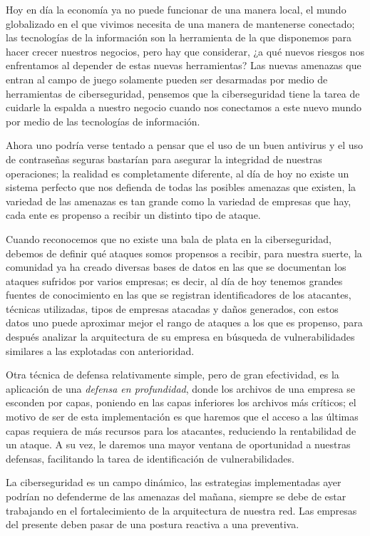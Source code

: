 \documentclass[12pt]{article}
\begin{document}
    Hoy en día la economía ya no puede funcionar de una manera local, el mundo globalizado en el que vivimos necesita de una manera de mantenerse conectado; las tecnologías de la información son la herramienta de la que disponemos para hacer crecer nuestros negocios, pero hay que considerar, ¿a qué nuevos riesgos nos enfrentamos al depender de estas nuevas herramientas? Las nuevas amenazas que entran al campo de juego solamente pueden ser desarmadas por medio de herramientas de ciberseguridad, pensemos que la ciberseguridad tiene la tarea de cuidarle la espalda a nuestro negocio cuando nos conectamos a este nuevo mundo por medio de las tecnologías de información.

    Ahora uno podría verse tentado a pensar que el uso de un buen antivirus y el uso de contraseñas seguras bastarían para asegurar la integridad de nuestras operaciones; la realidad es completamente diferente, al día de hoy no existe un sistema perfecto que nos defienda de todas las posibles amenazas que existen, la variedad de las amenazas es tan grande como la variedad de empresas que hay, cada ente es propenso a recibir un distinto tipo de ataque.

    Cuando reconocemos que no existe una bala de plata en la ciberseguridad, debemos de definir qué ataques somos propensos a recibir, para nuestra suerte, la comunidad ya ha creado diversas bases de datos en las que se documentan los ataques sufridos por varios empresas; es decir, al día de hoy tenemos grandes fuentes de conocimiento en las que se registran identificadores de los atacantes, técnicas utilizadas, tipos de empresas atacadas y daños generados, con estos datos uno puede aproximar mejor el rango de ataques a los que es propenso, para después analizar la arquitectura de su empresa en búsqueda de vulnerabilidades similares a las explotadas con anterioridad.

    Otra técnica de defensa relativamente simple, pero de gran efectividad, es la aplicación de una \emph{defensa en profundidad}, donde los archivos de una empresa se esconden por capas, poniendo en las capas inferiores los archivos más críticos; el motivo de ser de esta implementación es que haremos que el acceso a las últimas capas requiera de más recursos para los atacantes, reduciendo la rentabilidad de un ataque. A su vez, le daremos una mayor ventana de oportunidad a nuestras defensas, facilitando la tarea de identificación de vulnerabilidades.

    La ciberseguridad es un campo dinámico, las estrategias implementadas ayer podrían no defenderme de las amenazas del mañana, siempre se debe de estar trabajando en el fortalecimiento de la arquitectura de nuestra red. Las empresas del presente deben pasar de una postura reactiva a una preventiva.
\end{document}
